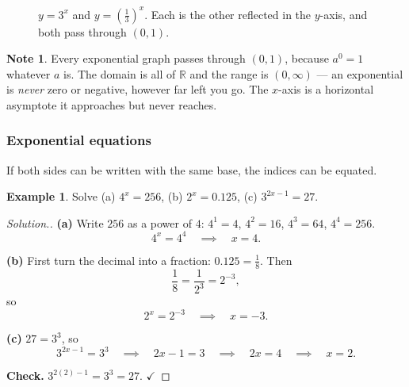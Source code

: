 \documentclass[11pt,a4paper]{article}
\theoremstyle{definition}
\newtheorem{example}[thm]{Example}
\newtheorem{note}[thm]{Note}
\newenvironment{solution}
  {\renewcommand{\qedsymbol}{}\begin{proof}[\textit{Solution}.]}
  {\end{proof}}
\let\amscheckmark\checkmark
\renewcommand{\checkmark}{\ensuremath{\amscheckmark}}
\begin{document}
\begin{figure}[H]
\centering
{}
\caption{$y=3^x$ and $y=\left(\frac13\right)^x$. Each is the other reflected in the $y$-axis, and both pass through $(0,1)$.}
\end{figure}

\begin{note}
Every exponential graph passes through $(0,1)$, because $a^0=1$ whatever $a$ is. The
domain is all of $\mathbb{R}$ and the range is $(0,\infty)$ --- an exponential is
\emph{never} zero or negative, however far left you go. The $x$-axis is a horizontal
asymptote it approaches but never reaches.
\end{note}

\subsubsection{Exponential equations}

If both sides can be written with the same base, the indices can be equated.

\begin{example}
Solve (a) $4^x=256$, \quad (b) $2^x=0.125$, \quad (c) $3^{2x-1}=27$.
\end{example}

\begin{solution}
\textbf{(a)} Write $256$ as a power of $4$: $4^1=4$, $4^2=16$, $4^3=64$, $4^4=256$.
$$4^x=4^4\quad\implies\quad x=4.$$

\textbf{(b)} First turn the decimal into a fraction: $0.125=\frac{1}{8}$. Then
$$\frac{1}{8}=\frac{1}{2^3}=2^{-3},$$
so
$$2^x=2^{-3}\quad\implies\quad x=-3.$$

\textbf{(c)} $27=3^3$, so
$$3^{2x-1}=3^3\quad\implies\quad 2x-1=3\quad\implies\quad 2x=4\quad\implies\quad x=2.$$

\textbf{Check.} $3^{2(2)-1}=3^3=27$. \checkmark
\end{solution}
\end{document}
